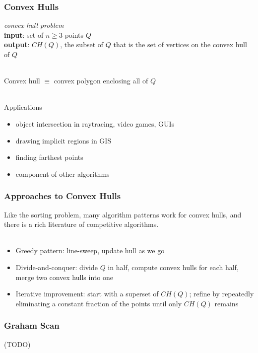 \documentclass{beamer}
\newcommand{\stanza}{ \\~\ }
\begin{document}
\begin{frame} \frametitle{Convex Hulls}
\emph{convex hull problem} \\
\textbf{input}: set of $n \geq 3$ points $Q$ \\
\textbf{output}: $CH(Q)$, the subset of $Q$ that is the set of vertices on
  the convex hull of $Q$ \stanza

Convex hull $\equiv$ convex polygon enclosing all of $Q$ \stanza

Applications
\begin{itemize}
  \item object intersection in raytracing, video games, GUIs
  \item drawing implicit regions in GIS
  \item finding farthest points
  \item component of other algorithms
\end{itemize}
\end{frame}

\begin{frame} \frametitle{Approaches to Convex Hulls}
Like the sorting problem, many algorithm patterns work for convex hulls,
and there is a rich literature of competitive algorithms. \stanza

\begin{itemize}
  \item Greedy pattern: line-sweep, update hull as we go
  \item Divide-and-conquer: divide $Q$ in half, compute convex hulls for each
    half, merge two convex hulls into one
  \item Iterative improvement: start with a superset of $CH(Q)$; refine by repeatedly eliminating
    a constant fraction of the points until only $CH(Q)$ remains
\end{itemize}
\end{frame}

\begin{frame} \frametitle{Graham Scan}

  (TODO)

\end{frame}
\end{document}
